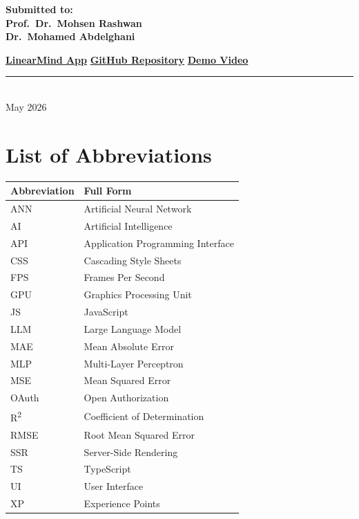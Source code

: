 \documentclass[12pt, a4paper]{article}
\begin{document}
\begin{titlepage}
\begin{center}
        \vspace{1cm}

        \textbf{Submitted to:} \\
        \textbf{Prof.\ Dr.\ Mohsen Rashwan} \\
        \textbf{Dr.\ Mohamed Abdelghani} \\
    \end{center}

    \vfill

    \faGlobe\hspace{0.4em}\href{https://linearmind.vercel.app/}{\textbf{LinearMind App}}
    \hfill
    \faGithub\hspace{0.4em}\href{https://github.com/al-sakka/Linear-Depression}{\textbf{GitHub Repository}}
    \hfill
    \faYoutube\hspace{0.4em}\href{https://youtu.be/wxZALD-X8ws}{\textbf{Demo Video}}

    \vspace{1cm}
    \rule{0.3\linewidth}{0.2mm} \\
    {\large May 2026}
\end{titlepage}

\tableofcontents
\listoffigures
\listoftables

\vspace{1.5em}
\section*{List of Abbreviations}

\begin{table}[H]
\centering
\begin{tabular}{l l}
\toprule
\textbf{Abbreviation} & \textbf{Full Form} \\
\midrule
ANN & Artificial Neural Network \\
AI & Artificial Intelligence \\
API & Application Programming Interface \\
CSS & Cascading Style Sheets \\
FPS & Frames Per Second \\
GPU & Graphics Processing Unit \\
JS & JavaScript \\
LLM & Large Language Model \\
MAE & Mean Absolute Error \\
MLP & Multi-Layer Perceptron \\
MSE & Mean Squared Error \\
OAuth & Open Authorization \\
R\textsuperscript{2} & Coefficient of Determination \\
RMSE & Root Mean Squared Error \\
SSR & Server-Side Rendering \\
TS & TypeScript \\
UI & User Interface \\
XP & Experience Points \\
\bottomrule
\end{tabular}
\end{table}
\end{document}
